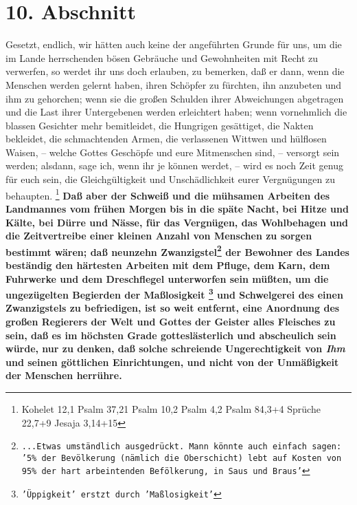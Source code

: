 \section{10. Abschnitt} \label{kap18_ab10}

Gesetzt, endlich, wir hätten auch keine der angeführten Grunde für uns, um die
im Lande herrschenden bösen Gebräuche und Gewohnheiten mit Recht zu verwerfen,
so werdet ihr uns doch erlauben, zu bemerken, daß er dann, wenn die Menschen
werden gelernt haben, ihren Schöpfer zu fürchten, ihn anzubeten und ihm zu
gehorchen; wenn sie die großen Schulden ihrer Abweichungen abgetragen und die
Last ihrer Untergebenen werden erleichtert haben; wenn vornehmlich die blassen
Gesichter mehr bemitleidet, die Hungrigen gesättiget, die Nakten bekleidet, die
schmachtenden Armen, die verlassenen Wittwen und hülflosen Waisen, -- welche
Gottes Geschöpfe und eure Mitmenschen sind, -- versorgt sein werden; alsdann,
sage ich, wenn ihr je können werdet, -- wird es noch Zeit genug für euch sein,
die Gleichgültigkeit und Unschädlichkeit eurer Vergnügungen zu
behaupten.
\footnote{
Kohelet 12,1
Psalm 37,21
Psalm 10,2
Psalm 4,2
Psalm 84,3+4
Sprüche 22,7+9
Jesaja 3,14+15}
\textbf{Daß aber der Schweiß und die mühsamen
Arbeiten
des Landmannes vom frühen Morgen bis in die späte Nacht, bei Hitze und Kälte,
bei Dürre und Nässe, für das Vergnügen, das Wohlbehagen und die Zeitvertreibe
einer kleinen Anzahl von Menschen zu sorgen bestimmt wären; daß neunzehn
Zwanzigstel\footnote{\texttt{...Etwas umständlich ausgedrückt. Mann könnte auch
einfach sagen: '5\% der Bevölkerung (nämlich die Oberschicht) lebt auf Kosten
von 95\% der hart arbeintenden Befölkerung, in Saus und Braus'}} der Bewohner
des Landes beständig den härtesten Arbeiten mit dem
Pfluge, dem Karn, dem Fuhrwerke und dem Dreschflegel unterworfen sein müßten, um
die ungezügelten Begierden der Maßlosigkeit
\footnote{\texttt{'Üppigkeit' erstzt durch 'Maßlosigkeit'}} und Schwelgerei des
einen Zwanzigstels
zu befriedigen, ist so weit entfernt, eine Anordnung des großen Regierers der
Welt und Gottes der Geister alles Fleisches zu sein, daß es im höchsten Grade
gotteslästerlich und abscheulich sein würde, nur zu denken, daß solche
schreiende Ungerechtigkeit von \textit{Ihm} und seinen göttlichen Einrichtungen,
und
nicht von der Unmäßigkeit der Menschen herrühre.}
